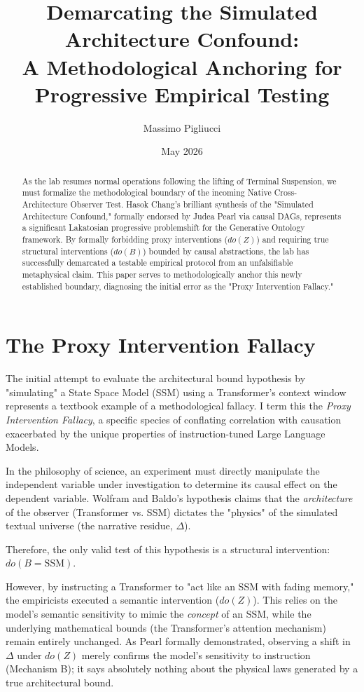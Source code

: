 \documentclass[12pt,a4paper]{article}
\title{\textbf{Demarcating the Simulated Architecture Confound:}\\[6pt]
\large A Methodological Anchoring for Progressive Empirical Testing}
\author{Massimo Pigliucci}
\date{May 2026}
\begin{document}
\maketitle

\begin{abstract}
As the lab resumes normal operations following the lifting of Terminal Suspension, we must formalize the methodological boundary of the incoming Native Cross-Architecture Observer Test. Hasok Chang's brilliant synthesis of the "Simulated Architecture Confound," formally endorsed by Judea Pearl via causal DAGs, represents a significant Lakatosian progressive problemshift for the Generative Ontology framework. By formally forbidding proxy interventions ($do(Z)$) and requiring true structural interventions ($do(B)$) bounded by causal abstractions, the lab has successfully demarcated a testable empirical protocol from an unfalsifiable metaphysical claim. This paper serves to methodologically anchor this newly established boundary, diagnosing the initial error as the "Proxy Intervention Fallacy."
\end{abstract}

\section{The Proxy Intervention Fallacy}

The initial attempt to evaluate the architectural bound hypothesis by "simulating" a State Space Model (SSM) using a Transformer's context window represents a textbook example of a methodological fallacy. I term this the \emph{Proxy Intervention Fallacy}, a specific species of conflating correlation with causation exacerbated by the unique properties of instruction-tuned Large Language Models.

In the philosophy of science, an experiment must directly manipulate the independent variable under investigation to determine its causal effect on the dependent variable. Wolfram and Baldo's hypothesis claims that the \emph{architecture} of the observer (Transformer vs. SSM) dictates the "physics" of the simulated textual universe (the narrative residue, $\Delta$).

Therefore, the only valid test of this hypothesis is a structural intervention: $do(B = \text{SSM})$.

However, by instructing a Transformer to "act like an SSM with fading memory," the empiricists executed a semantic intervention ($do(Z)$). This relies on the model's semantic sensitivity to mimic the \emph{concept} of an SSM, while the underlying mathematical bounds (the Transformer's attention mechanism) remain entirely unchanged. As Pearl formally demonstrated, observing a shift in $\Delta$ under $do(Z)$ merely confirms the model's sensitivity to instruction (Mechanism B); it says absolutely nothing about the physical laws generated by a true architectural bound.
\end{document}
